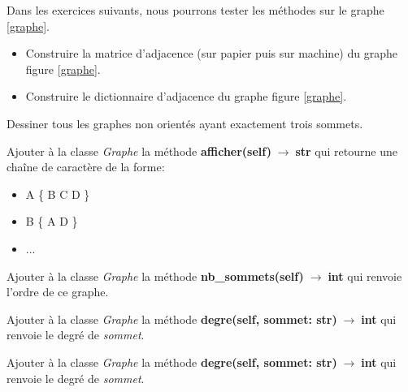 \documentclass[a4paper,11pt]{article}
\begin{document}
\begin{Form}
Dans les exercices suivants, nous pourrons tester les méthodes sur le graphe \ref{graphe}.
\begin{center}
\label{graphe}
\end{center}
\begin{exo}
\begin{itemize}
\item Construire la matrice d'adjacence (sur papier puis sur machine) du graphe figure \ref{graphe}.
\item Construire le dictionnaire d'adjacence du graphe figure \ref{graphe}.
\end{itemize}
\end{exo}
\begin{exo}
Dessiner tous les graphes non orientés ayant exactement trois sommets.
\end{exo}
\begin{exo}
Ajouter à la classe \emph{Graphe} la méthode \textbf{afficher(self)$\;\rightarrow\;$str} qui retourne une chaîne de caractère de la forme:
\begin{itemize}
\item A \{ B C D \}
\item B \{ A D \}
\item ...
\end{itemize}
\end{exo}
\begin{exo}
Ajouter à la classe \emph{Graphe} la méthode \textbf{nb\_sommets(self)$\;\rightarrow\;$int} qui renvoie l'ordre de ce graphe.
\end{exo}
\begin{exo}
Ajouter à la classe \emph{Graphe} la méthode \textbf{degre(self, sommet: str)$\;\rightarrow\;$int} qui renvoie le degré de \emph{sommet}.
\end{exo}
\begin{exo}
Ajouter à la classe \emph{Graphe} la méthode \textbf{degre(self, sommet: str)$\;\rightarrow\;$int} qui renvoie le degré de \emph{sommet}.

\end{exo}
\end{Form}
\end{document}
